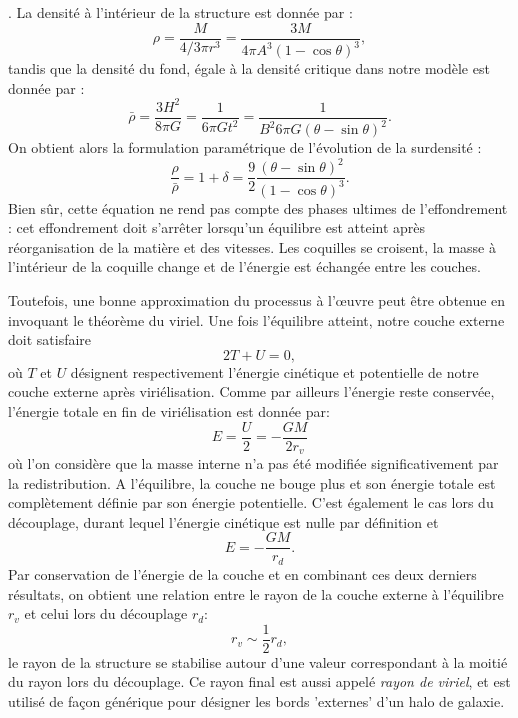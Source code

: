 . La densité à l'intérieur de la structure est donnée par :
\begin{equation}
\rho = \frac{M}{4/3 \pi r^3}=\frac{3M}{4\pi A^3(1-\cos \theta)^3}, 
\end{equation}
tandis que la densité du fond, égale à la densité critique dans notre modèle est donnée par :
\begin{equation}
\bar \rho =\frac{3H^2}{8\pi G}=\frac{1}{6\pi G t^2}=\frac{1}{B^2 6\pi G (\theta-\sin \theta)^2}.
\end{equation}
On obtient alors la formulation paramétrique de l'évolution de la surdensité :
\begin{equation}
\frac{\rho}{\bar \rho}=1+\delta=\frac{9}{2}\frac{(\theta - \sin \theta)^2}{(1-\cos \theta)^3}.
\label{e:dcoll}
\end{equation}
Bien sûr, cette équation ne rend pas compte des phases ultimes de l'effondrement : cet effondrement doit s'arrêter lorsqu'un équilibre est atteint après réorganisation de la matière et des vitesses. Les coquilles se croisent, la masse à l'intérieur de la coquille change et de l'énergie est échangée entre les couches.  

Toutefois, une bonne approximation du processus à l'œuvre peut être obtenue en invoquant le théorème du viriel. Une fois l'équilibre atteint, notre couche externe doit satisfaire
\begin{equation}
2 T +U = 0,
\end{equation}
où $T$ et $U$ désignent respectivement l'énergie cinétique et potentielle de notre couche externe après viriélisation. Comme par ailleurs l'énergie reste conservée, l'énergie totale en fin de viriélisation est donnée par:
\begin{equation}
E=\frac{U}{2}=-\frac{GM}{2r_v}
\end{equation}
où l'on considère que la masse interne n'a pas été modifiée significativement par la redistribution. A l'équilibre, la couche ne bouge plus et son énergie totale est complètement définie par son énergie potentielle. C'est également le cas lors du découplage, durant lequel l'énergie cinétique est nulle par définition et 
\begin{equation}
E=-\frac{GM}{r_d}.
\end{equation}
Par conservation de l'énergie de la couche et en combinant ces deux derniers résultats, on obtient une relation entre le rayon de la couche externe à l'équilibre $r_v$ et celui lors du découplage $r_d$:
\begin{equation}
r_v\sim \frac{1}{2}r_d,
\end{equation}
le rayon de la structure se stabilise autour d'une valeur correspondant à la moitié du rayon lors du découplage. Ce rayon final est aussi appelé \textit{rayon de viriel}, et est utilisé de façon générique pour désigner les bords 'externes' d'un halo de galaxie.

